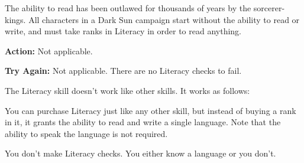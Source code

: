 
The ability to read has been outlawed for thousands of years by the sorcerer-kings. All characters in a {\tableheader Dark Sun} campaign start without the ability to read or write, and must take ranks in Literacy in order to read anything.

\textbf{Action:} Not applicable.

\textbf{Try Again:} Not applicable. There are no Literacy checks to fail.

The Literacy skill doesn't work like other skills. It works as follows:

\begin{itemize*}
\item You can purchase Literacy just like any other skill, but instead of buying a rank in it, it grants the ability to read and write a single language. Note that the ability to speak the language is not required.
\item You don't make Literacy checks. You either know a language or you don't.
\end{itemize*}

